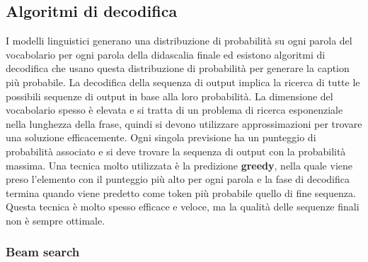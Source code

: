\subsection{Algoritmi di decodifica}\label{algoritmi_decodifica}
I modelli linguistici generano una distribuzione di probabilità su ogni parola del vocabolario per ogni parola della didascalia finale ed esistono algoritmi di decodifica che usano questa distribuzione di probabilità per generare la caption più probabile.
La decodifica della sequenza di output implica la ricerca di tutte le possibili sequenze di output in base alla loro probabilità. La dimensione del vocabolario spesso è elevata e si tratta di un problema di ricerca esponenziale nella lunghezza della frase, quindi si devono utilizzare approssimazioni per trovare una soluzione efficacemente.
Ogni singola previsione ha un punteggio di probabilità associato e si deve trovare la sequenza di output con la probabilità massima. Una tecnica molto utilizzata è la predizione \textbf{greedy}, nella quale viene preso l'elemento con il punteggio più alto per ogni parola e la fase di decodifica termina quando viene predetto come token più probabile quello di fine sequenza. Questa tecnica è molto spesso efficace e veloce, ma la qualità delle sequenze finali non è sempre ottimale.

\subsubsection{Beam search}\label{beam_search}

